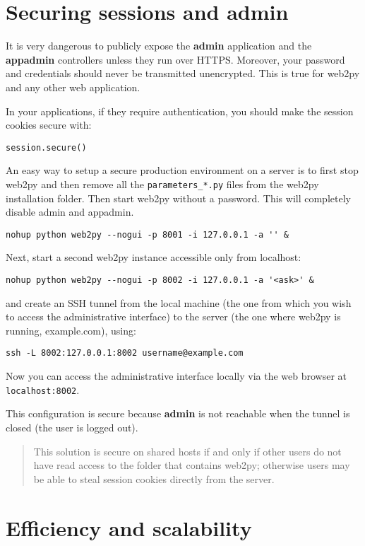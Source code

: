 \documentclass[justified,sixbynine,notoc]{tufte-book}
\def\ft{\small\tt}
\def\inxx#1{\index{#1}}
\begin{document}
\begin{fullwidth}
\goodbreak\section{Securing sessions and {\bf admin}}

\inxx{security} \inxx{admin}

It is very dangerous to publicly expose the {\bf admin} application and the {\bf appadmin} controllers unless they run over HTTPS. Moreover, your password and credentials should never be transmitted unencrypted. This is true for web2py and any other web application.

In your applications, if they require authentication, you should make the session cookies secure with:
\begin{lstlisting}
session.secure()
\end{lstlisting}

An easy way to setup a secure production environment on a server is to first stop web2py and then remove all the {\ft parameters\_*.py} files from the web2py installation folder.  Then start web2py without a password. This will completely disable admin and appadmin.
\begin{lstlisting}
nohup python web2py --nogui -p 8001 -i 127.0.0.1 -a '' &
\end{lstlisting}

Next, start a second web2py instance accessible only from localhost:
\begin{lstlisting}
nohup python web2py --nogui -p 8002 -i 127.0.0.1 -a '<ask>' &
\end{lstlisting}
\noindent and create an SSH tunnel from the local machine (the one from which you wish to access the administrative interface) to the server (the one where web2py is running, example.com), using:
\begin{lstlisting}
ssh -L 8002:127.0.0.1:8002 username@example.com
\end{lstlisting}

Now you can access the administrative interface locally via the web browser at {\ft localhost:8002}.

This configuration is secure because {\bf admin} is not reachable when the tunnel is closed (the user is logged out).

\begin{quote}This solution is secure on shared hosts if and only if other users do not have read access to the folder that contains web2py; otherwise users may be able to steal session cookies directly from the server.\end{quote}
\goodbreak\section{Efficiency and scalability}


\end{fullwidth}
\end{document}
